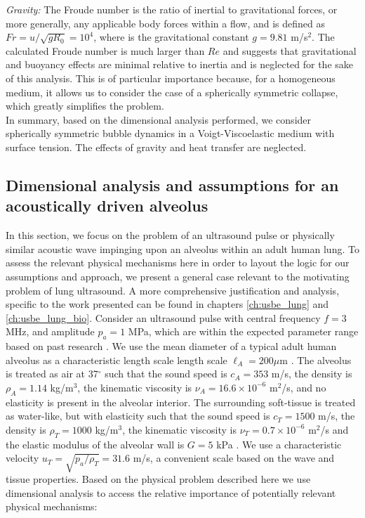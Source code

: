 \noindent\textit{Gravity:} The Froude number is the ratio
of inertial to gravitational forces, or more generally, any applicable
body forces within a flow, and is defined as
$Fr = u/\sqrt{g R_0}=10^4$, where is the gravitational constant
$g=9.81$ m/s$^2$. The calculated Froude number is much larger than
$Re$ and suggests that gravitational and buoyancy effects are minimal
relative to inertia and is neglected for the sake of this
analysis. This is of particular importance because, for a homogeneous
medium, it allows us to consider the case of a spherically symmetric collapse, which greatly simplifies the problem.\\

In summary, based on the dimensional analysis performed, we consider
spherically symmetric bubble dynamics in a Voigt-Viscoelastic medium
with surface tension. The effects of gravity and heat transfer are
neglected.

\subsection{Dimensional analysis and assumptions for an acoustically
  driven alveolus}%
\label{sec:lung_assumptions}%
In this section, we focus on the problem of an ultrasound pulse or
physically similar acoustic wave impinging upon an alveolus within an
adult human lung. To assess the relevant physical mechanisms here in
order to layout the logic for our assumptions and approach, we present
a general case relevant to the motivating problem of lung
ultrasound. A more comprehensive justification and analysis, specific
to the work presented can be found in chapters \ref{ch:usbe_lung} and
\ref{ch:usbe_lung_bio}. Consider an ultrasound pulse with central
frequency $f = 3$ MHz, and amplitude $p_a = 1$ MPa, which are within
the expected parameter range based on past research
\citep{Miller2015a}. We use the mean diameter of a typical adult human
alveolus as a characteristic length scale length scale
$\ell_A = 200 \mu$m \citep{Ochs2004}. The alveolus is treated as air
at 37$^\circ$ such that the sound speed is $c_A = 353$ m/s, the
density is $\rho_A = 1.14$ kg/m$^3$, the kinematic viscosity is
$\nu_A = 16.6\times 10^{-6}$ m$^2$/s, and no elasticity is present in
the alveolar interior. The surrounding soft-tissue is treated as
water-like, but with elasticity such that the sound speed is
$c_T=1500$ m/s, the density is $\rho_T=1000$ kg/m$^3$, the kinematic
viscosity is $\nu_T = 0.7 \times 10^{-6}$ m$^2$/s and the elastic
modulus of the alveolar wall is $G = 5$ kPa \citep{Cavalcante2005}. We
use a characteristic velocity $u_T = \sqrt{p_a/\rho_T}=31.6$ m/s, a
convenient scale based on the wave and tissue properties. Based on the
physical problem described here we use dimensional analysis to access
the relative importance of potentially relevant physical mechanisms:\\

